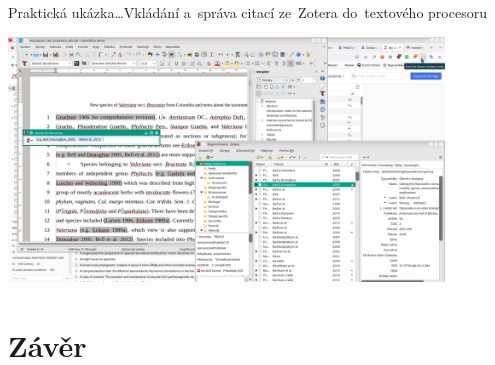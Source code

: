 \documentclass[compress, ucs, xelatex, 11pt, xcolor=svgnames, aspectratio=169,
	hyperref={
		bookmarks=true,
		unicode=true,
		colorlinks=true,
		pdftitle={Citacni software},
		plainpages=false,
		pdfauthor={Vojtech Zeisek},
		pdfsubject={Kratky uvod do citacniho software},
		pdfcreator={XeLaTeX},
		pdfkeywords={citace, reference, software, literatura},
		linkcolor=Crimson, %
		anchorcolor=Magenta, %
		citecolor=Magenta, %
		filecolor=Magenta, %
		menucolor=Magenta, %
		urlcolor=DarkTurquoise, %
		pdftex},
	url={hyphens, lowtilde} %
	]{beamer}
\begin{document}
\begin{frame}{Praktická ukázka\ldots}{Vkládání a~správa citací ze~Zotera do~textového procesoru}
	\begin{center}
		\includegraphics[height=6.5cm]{zotero_writer_knihovna.png}
	\end{center}
\end{frame}

\section{Závěr}
\end{document}
